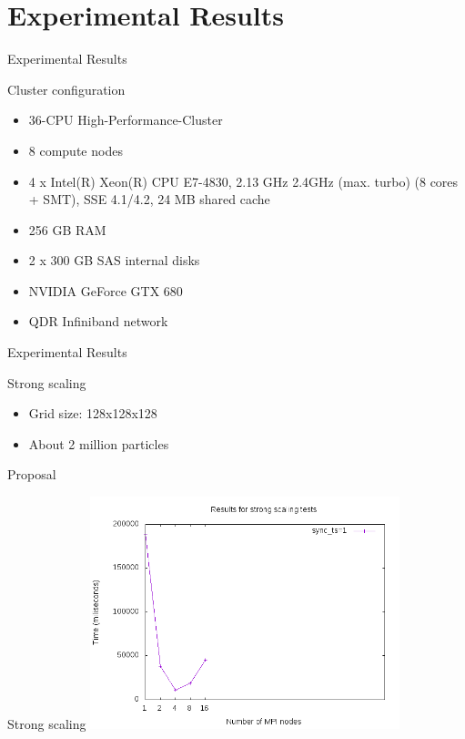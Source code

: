 \documentclass[aspectratio=43,t]{beamer}
\begin{document}
  \section{Experimental Results}
  \begin{frame}{Experimental Results}
    \begin{block}{Cluster configuration}
      \begin{itemize}
        \item 36-CPU High-Performance-Cluster
        \item 8 compute nodes
        \item 4 x Intel(R) Xeon(R) CPU E7-4830, 2.13 GHz 2.4GHz (max. turbo) (8 cores + SMT), SSE 4.1/4.2, 24 MB shared cache
        \item 256 GB RAM
        \item 2 x 300 GB SAS internal disks
        \item NVIDIA GeForce GTX 680
        \item QDR Infiniband network
      \end{itemize}
    \end{block}
  \end{frame}

  \begin{frame}{Experimental Results}
    \begin{block}{Strong scaling}
      \begin{itemize}
        \item Grid size: 128x128x128
        \item About 2 million particles
      \end{itemize}
    \end{block}
  \end{frame}

  \begin{frame}{Proposal}
    \begin{block}{Strong scaling}
      \includegraphics[width=9cm]{results/strong_scaling.png}
    \end{block}
  \end{frame}
\end{document}
